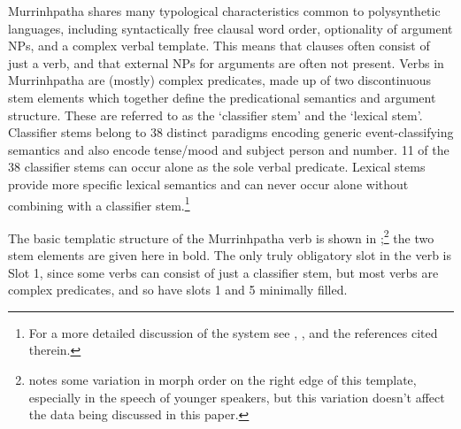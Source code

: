 \documentclass[output=paper,colorlinks,citecolor=brown]{langscibook}
\begin{document}
Murrinhpatha shares many typological characteristics common to polysynthetic languages, including syntactically free clausal word order, optionality of argument NPs, and a complex verbal template. This means that clauses often consist of just a verb, and that external NPs for arguments are often not present. Verbs in Murrinhpatha are (mostly) complex predicates, made up of two discontinuous stem elements which together define the predicational semantics and argument structure. These are referred to as the ‘classifier stem’ and the ‘lexical stem’. Classifier stems belong to 38 distinct paradigms encoding generic event-classifying semantics and also encode tense/mood and subject person and number. 11 of the 38 classifier stems can occur alone as the sole verbal predicate. Lexical stems provide more specific lexical semantics and can never occur alone without combining with a classifier stem.\footnote{For a more detailed discussion of the system see \citet{Nordlinger2015}, \citet{Mansfield2019}, and the references cited therein.}

The basic templatic structure of the Murrinhpatha verb is shown in ;\footnote{\citet{Mansfield2019} notes some variation in morph order on the right edge of this template, especially in the speech of younger speakers, but this variation doesn’t affect the data being discussed in this paper.}
the two stem elements are given here in bold. The only truly obligatory slot in the verb is Slot 1, since some verbs can consist of just a classifier stem, but most verbs are complex predicates, and so have slots 1 and 5 minimally filled.

\end{document}
